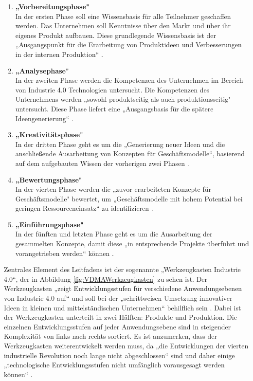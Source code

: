 \begin{enumerate}
	\item \textbf{„Vorbereitungsphase"} \cite[S.10]{2} \\ In der ersten Phase soll eine Wissensbasis für alle Teilnehmer geschaffen werden. Das Unternehmen soll Kenntnisse über den Markt und über ihr eigenes Produkt aufbauen. Diese grundlegende Wissensbasis ist der „Ausgangspunkt für die Erarbeitung von Produktideen und Verbesserungen in der internen Produktion“ \cite[S.10]{2}.
	\item \textbf{„Analysephase"} \cite[S.10]{2} \\ In der zweiten Phase werden die Kompetenzen des Unternehmen im Bereich von Industrie 4.0 Technologien untersucht. Die Kompetenzen des Unternehmens werden „sowohl produktseitig als auch produktionsseitig" \cite[S.10]{2} untersucht. Diese Phase liefert eine „Ausgangsbasis für die spätere Ideengenerierung“ \cite[S.10]{2}.
	\item \textbf{„Kreativitätsphase"} \cite[S.10]{2} \\ In der dritten Phase geht es um die „Generierung neuer Ideen und die anschließende Ausarbeitung von Konzepten für Geschäftsmodelle“\cite[S.10]{2}, basierend auf dem aufgebauten Wissen der vorherigen zwei Phasen \cite[S.10]{2}.
	\item \textbf{„Bewertungsphase"} \cite[S.10]{2} \\ In der vierten Phase werden die „zuvor erarbeiteten Konzepte für Geschäftsmodelle" \cite[S.10]{2} bewertet, um „Geschäftsmodelle mit hohem Potential bei geringen Ressourceneinsatz“ \cite[S.10]{2} zu identifizieren \cite[S.10]{2}.
	\item \textbf{„Einführungsphase"} \cite[S.10]{2} \\ In der fünften und letzten Phase geht es um die Ausarbeitung der gesammelten Konzepte, damit diese „in entsprechende Projekte überführt und vorangetrieben werden“ \cite[S.10]{2} können \cite[S.10]{2}.
\end{enumerate}
Zentrales Element des Leitfadens ist der sogenannte „Werkzeugkasten Industrie 4.0“, der in  Abbildung \ref{fig:VDMAWerkzeugkasten} zu sehen ist. Der Werkzeugkasten „zeigt Entwicklungsstufen für verschiedene Anwendungsebenen von Industrie 4.0 auf“ \cite[S.11]{2} und soll bei der „schrittweisen Umsetzung innovativer Ideen in kleinen und mittelständischen Unternehmen“ behilflich sein \cite[S.11]{2}. Dabei ist der Werkzeugkasten unterteilt in zwei Hälften: Produkte und Produktion. Die einzelnen Entwicklungsstufen auf jeder Anwendungsebene sind in steigender Komplexität von links nach rechts sortiert. Es ist anzumerken, dass der Werkzeugkasten weiterentwickelt werden muss, da „die Entwicklungen der vierten industrielle Revolution noch lange nicht abgeschlossen“ \cite[S.11]{2} sind und daher einige „technologische Entwicklungsstufen nicht umfänglich vorausgesagt werden können“ \cite[S.11]{2}.
